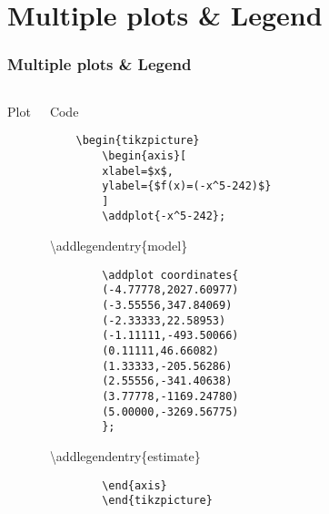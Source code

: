 \documentclass{beamer}
\begin{document}
\section{Multiple plots \& Legend}
\begin{frame}[fragile]
\frametitle{Multiple plots \& Legend}
\begin{columns}
\begin{block}{Plot}
	\end{block}
\begin{block}{Code}
\tiny{
\begin{verbatim}
	\begin{tikzpicture}
		\begin{axis}[
		xlabel=$x$, 
		ylabel={$f(x)=(-x^5-242)$}
		]
		\addplot{-x^5-242};
\end{verbatim}
		{\color{blue}\textbackslash addlegendentry\{model\}}
\begin{verbatim}
		\addplot coordinates{
		(-4.77778,2027.60977)
		(-3.55556,347.84069)
		(-2.33333,22.58953)
		(-1.11111,-493.50066)
		(0.11111,46.66082)
		(1.33333,-205.56286)
		(2.55556,-341.40638)
		(3.77778,-1169.24780)
		(5.00000,-3269.56775)
		};
\end{verbatim}
		{\color{blue}\textbackslash addlegendentry\{estimate\}}
\begin{verbatim}
		\end{axis}
		\end{tikzpicture}
\end{verbatim}
		}
	\end{block}
\end{columns}
\end{frame}
\end{document}
